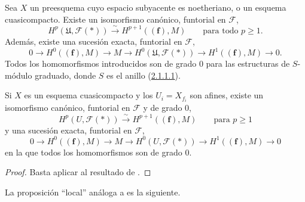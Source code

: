 \begin{proposition}[2.1.3]
\label{III.2.1.3}
\label{III.2.1.3-fr}
Sea $X$ un preesquema cuyo espacio subyacente es noetheriano, o un esquema cuasicompacto.
Existe un isomorfismo canónico, funtorial en $\mathcal F$,
\begin{equation}
\label{III.2.1.3.1-fr}
\tag{2.1.3.1}
H^p(\mathfrak U,\mathcal F(*))
\xrightarrow{\sim}H^{p+1}((\mathbf f),M)
\qquad\text{para todo }p\geq1.
\end{equation}
Además, existe una sucesión exacta, funtorial en $\mathcal F$,
\begin{equation}
\label{III.2.1.3.2-fr}
\tag{2.1.3.2}
0\longrightarrow H^0((\mathbf f),M)\longrightarrow M
\longrightarrow H^0(\mathfrak U,\mathcal F(*))
\longrightarrow H^1((\mathbf f),M)\longrightarrow0.
\end{equation}
Todos los homomorfismos introducidos son de grado $0$ para las estructuras de $S$-módulo graduado, donde $S$ es el anillo (\hyperref[III.2.1.1.1]{2.1.1.1}).
\end{proposition}

\begin{corollary}[2.1.4]
\label{III.2.1.4}
\label{III.2.1.4-fr}
Si $X$ es un esquema cuasicompacto y los $U_i=X_{f_i}$ son afines, existe un isomorfismo canónico, funtorial en $\mathcal F$ y de grado $0$,
\begin{equation}
\label{III.2.1.4.1-fr}
\tag{2.1.4.1}
H^p(U,\mathcal F(*))\xrightarrow{\sim}H^{p+1}((\mathbf f),M)
\qquad\text{para }p\geq1
\end{equation}
y una sucesión exacta, funtorial en $\mathcal F$,
\begin{equation}
\label{III.2.1.4.2-fr}
\tag{2.1.4.2}
0\longrightarrow H^0((\mathbf f),M)\longrightarrow M
\longrightarrow H^0(U,\mathcal F(*))
\longrightarrow H^1((\mathbf f),M)\longrightarrow0
\end{equation}
en la que todos los homomorfismos son de grado $0$.
\end{corollary}

\begin{proof}
Basta aplicar  al resultado de .
\end{proof}

La proposición ``local'' análoga a  es la siguiente.

